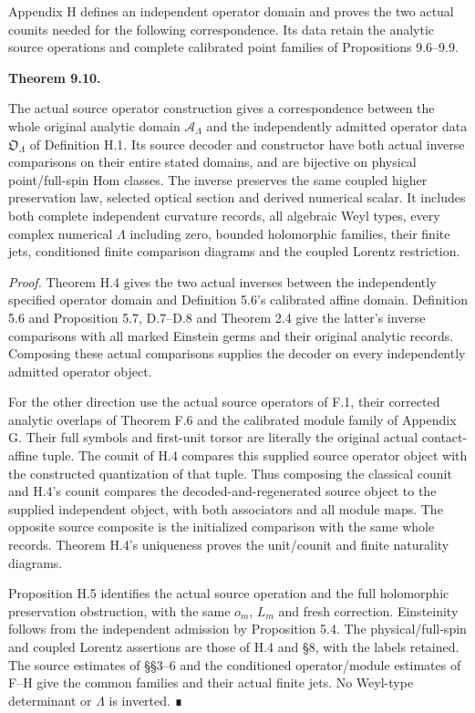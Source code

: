 \documentclass[
  english,
  11pt,
  reqno]{amsart}
\makeatletter
\newcommand{\pandocstatementheading}[1]{%
  \par\addpenalty{\@beginparpenalty}%
  \addvspace{.5\baselineskip plus .2\baselineskip minus .2\baselineskip}%
  {\normalfont\bfseries #1\par}%
  \nobreak\@afterindenttrue\@afterheading
}
\makeatother
\begin{document}
Appendix H defines an independent operator domain and proves the two
actual counits needed for the following correspondence. Its data retain
the analytic source operations and complete calibrated point families of
Propositions 9.6--9.9.

\pandocstatementheading{\protect{}\label{thm:gg-independent-source-operator-correspondence}Theorem 9.10.}

The actual source operator construction gives a correspondence between
the whole original analytic domain \(\mathcal A_\Lambda\) and the
independently admitted operator data \(\mathfrak O_\Lambda\) of
Definition H.1. Its source decoder and constructor have both actual
inverse comparisons on their entire stated domains, and are bijective on
physical point/full-spin Hom classes. The inverse preserves the same
coupled higher preservation law, selected optical section and derived
numerical scalar. It includes both complete independent curvature
records, all algebraic Weyl types, every complex numerical \(\Lambda\)
including zero, bounded holomorphic families, their finite jets,
conditioned finite comparison diagrams and the coupled Lorentz
restriction.

\emph{Proof.} Theorem H.4 gives the two actual inverses between the
independently specified operator domain and Definition 5.6's calibrated
affine domain. Definition 5.6 and Proposition 5.7, D.7--D.8 and Theorem
2.4 give the latter's inverse comparisons with all marked Einstein germs
and their original analytic records. Composing these actual comparisons
supplies the decoder on every independently admitted operator object.

For the other direction use the actual source operators of F.1, their
corrected analytic overlaps of Theorem F.6 and the calibrated module
family of Appendix G. Their full symbols and first-unit torsor are
literally the original actual contact-affine tuple. The counit of H.4
compares this supplied source operator object with the constructed
quantization of that tuple. Thus composing the classical counit and
H.4's counit compares the decoded-and-regenerated source object to the
supplied independent object, with both associators and all module maps.
The opposite source composite is the initialized comparison with the
same whole records. Theorem H.4's uniqueness proves the unit/counit and
finite naturality diagrams.

Proposition H.5 identifies the actual source operation and the full
holomorphic preservation obstruction, with the same \(o_m\), \(L_m\) and
fresh correction. Einsteinity follows from the independent admission by
Proposition 5.4. The physical/full-spin and coupled Lorentz assertions
are those of H.4 and §8, with the labels retained. The source estimates
of §§3--6 and the conditioned operator/module estimates of F--H give the
common families and their actual finite jets. No Weyl-type determinant
or \(\Lambda\) is inverted. ∎
\end{document}
